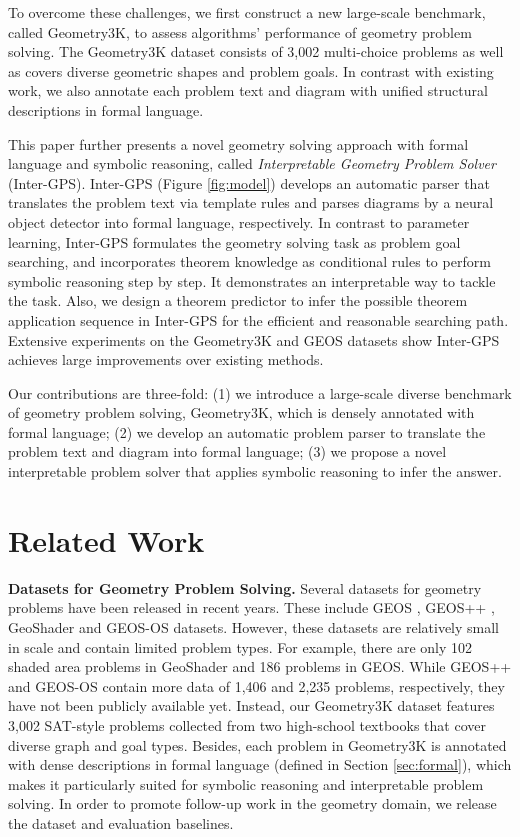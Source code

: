 \documentclass[11pt,a4paper]{article}
\begin{document}
To overcome these challenges, we first construct a new large-scale benchmark, called Geometry3K, to assess algorithms' performance of geometry problem solving. The Geometry3K dataset consists of 3,002 multi-choice problems as well as covers diverse geometric shapes and problem goals. %
In contrast with existing work, we also annotate each problem text and diagram with unified structural descriptions in formal language.

This paper further presents a novel geometry solving approach with formal language and symbolic reasoning, called \textit{Interpretable Geometry Problem Solver} (Inter-GPS). Inter-GPS (Figure \ref{fig:model}) develops an automatic parser that translates the problem text via template rules and parses diagrams by a neural object detector into formal language, respectively. In contrast to parameter learning, Inter-GPS formulates the geometry solving task as problem goal searching, and incorporates theorem knowledge as conditional rules to perform symbolic reasoning step by step. It demonstrates an interpretable way to tackle the task. Also, we design a theorem predictor to infer the possible theorem application sequence in Inter-GPS for the efficient and reasonable searching path. Extensive experiments on the Geometry3K and GEOS datasets show Inter-GPS achieves large improvements over existing methods.

Our contributions are three-fold: (1) we introduce a large-scale diverse benchmark of geometry problem
solving, Geometry3K, which is densely annotated with formal language; (2) we develop an automatic problem parser to translate the problem text and diagram into formal language; (3) we propose a novel interpretable problem solver that applies symbolic reasoning to infer the answer. 


\section{Related Work}
\textbf{Datasets for Geometry Problem Solving.} 
Several datasets for geometry problems have been released in recent years. These include GEOS \cite{seo2015solving}, GEOS++ \cite{sachan2017textbooks}, GeoShader \cite{alvin2017synthesis} and GEOS-OS \cite{sachan2017learning} datasets. However, these datasets are relatively small in scale and contain limited problem types. For example, there are only 102 shaded area problems in GeoShader and 186 problems in GEOS. While GEOS++ and GEOS-OS contain more data of 1,406 and 2,235 problems, respectively, they have not been publicly available yet. Instead, our Geometry3K dataset features 3,002 SAT-style problems collected from two high-school textbooks that cover diverse graph and goal types. Besides, each problem in Geometry3K is annotated with dense descriptions in formal language (defined in Section \ref{sec:formal}), which makes it particularly suited for symbolic reasoning and interpretable problem solving. In order to promote follow-up work in the geometry domain, we release the dataset and evaluation baselines.
\end{document}

